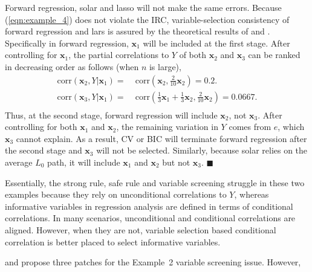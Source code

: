 \documentclass[12pt]{article}
\begin{document}
Forward regression, solar and lasso will not make the same errors. Because (\ref{eqn:example_4}) does not violate the IRC, variable-selection consistency of forward regression and lars is assured by the theoretical results of \citet{zhang09} and \citet{zhaoyu06}. Specifically in forward regression, $\mathbf{x}_1$ will be included  at the first stage. After controlling for $\mathbf{x}_1$, the partial correlations to $Y$ of both $\mathbf{x}_2$ and $\mathbf{x}_3$ can be ranked in decreasing order as follows (when $n$ is large),
%
\begin{equation}
  \begin{aligned}
    \mathrm{corr} \left( \mathbf{x}_2, Y \vert \mathbf{x}_1 \right)  = & \;\mathrm{corr} \left( \mathbf{x}_2, \frac{2}{10} \mathbf{x}_2 \right)
    = 0.2. \\
    \mathrm{corr} \left( \mathbf{x}_3, Y \vert \mathbf{x}_1 \right)  = & \;\mathrm{corr} \left( \frac{1}{3} \mathbf{x}_1 + \frac{1}{3} \mathbf{x}_2, \frac{2}{10} \mathbf{x}_2 \right)
    = 0.0667. \\
  \end{aligned}
\end{equation}
%
Thus, at the second stage, forward regression will include $\mathbf{x}_2$, not $\mathbf{x}_3$. After controlling for both $\mathbf{x}_1$ and $\mathbf{x}_2$, the remaining variation in $Y$ comes from $e$, which $\mathbf{x}_3$ cannot explain. As a result, CV or BIC will terminate forward regression after the second stage and $\mathbf{x}_3$ will not be selected. Similarly, because solar relies on the average $L_0$ path, it will include $\mathbf{x}_1$ and $\mathbf{x}_2$ but not $\mathbf{x}_3$. $\blacksquare$

\smallskip
Essentially, the strong rule, safe rule and variable screening struggle in these two examples because they rely on unconditional correlations to $Y$, whereas informative variables in regression analysis are defined in terms of conditional correlations. In many scenarios, unconditional and conditional correlations are aligned. However, when they are not, variable selection based conditional correlation is better placed to select informative variables.

\citet{fan2008sure} and \citet{barut2016conditional} propose three patches for the Example~2 variable screening issue. However,
\end{document}

